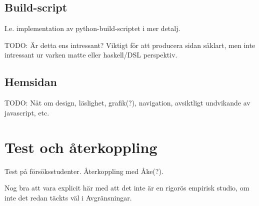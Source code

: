 \begin{binge}
  \subsection{Build-script}

  I.e. implementation av python-build-scriptet i mer detalj.

  TODO: Är detta ens intressant? Viktigt för att producera sidan såklart, men
  inte intressant ur varken matte eller haskell/DSL perspektiv.

  \subsection{Hemsidan}

  TODO: Nåt om design, läslighet, grafik(?), navigation, avsiktligt undvikande
  av javascript, etc.


  \section{Test och återkoppling}


  Test på försöksstudenter. Återkoppling med Åke(?).

  Nog bra att vara explicit här med att det inte är en rigorös empirisk
  studio, om inte det redan täckts väl i Avgränsningar.

\end{binge}
